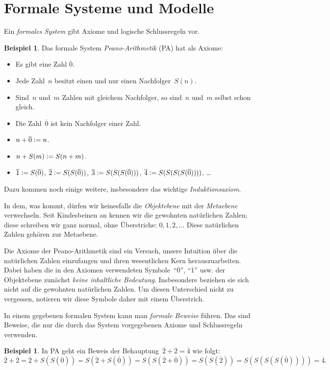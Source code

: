 \documentclass[twoside]{../zirkelblatt1415}
\theoremstyle{definition}
\newtheorem{bsp}[defn]{Beispiel}
\theoremstyle{plain}
\theoremstyle{remark}
\newcommand{\defeq}{\vcentcolon=}
\newcommand{\ol}[1]{\overline{#1}}
\begin{document}
\section{Formale Systeme und Modelle}

Ein \emph{formales System} gibt Axiome und logische Schlussregeln vor.

\begin{bsp}Das formale System \emph{Peano-Arithmetik} (PA) hat als Axiome:
\begin{itemize}
\item Es gibt eine Zahl $\ol{0}$.
\item Jede Zahl~$n$ besitzt einen und nur einen Nachfolger~$S(n)$.
\item Sind~$n$ und~$m$ Zahlen mit gleichem Nachfolger, so sind~$n$ und~$m$
selbst schon gleich.
\item Die Zahl~$\ol{0}$ ist kein Nachfolger einer Zahl.
\item $n + \ol{0} \defeq n$.
\item $n + S(m) \defeq S(n+m)$.
\item $\ol{1} \defeq S(\ol{0})$, $\ol{2} \defeq S(S(\ol{0}))$, $\ol{3} \defeq S(S(S(\ol{0})))$, $\ol{4} \defeq
S(S(S(S(\ol{0}))))$, \ldots
\end{itemize}
Dazu kommen noch einige weitere, insbesondere das wichtige
\emph{Induktionsaxiom}.
\end{bsp}

In dem, was kommt, dürfen wir keinesfalls die \emph{Objektebene} mit der
\emph{Metaebene} verwechseln. Seit Kindesbeinen an kennen wir die gewohnten
natürlichen Zahlen; diese schreiben wir ganz normal, ohne Überstriche:
$0,1,2,\ldots$ Diese natürlichen Zahlen gehören zur Metaebene.

Die Axiome der Peano-Arithmetik sind ein Versuch, unsere Intuition über die
natürlichen Zahlen einzufangen und ihren wesentlichen Kern herauszuarbeiten.
Dabei haben die in den Axiomen verwendeten Symbole~"`$\ol{0}$"', "`$\ol{1}$"'
usw. der Objektebene zunächst \emph{keine inhaltliche Bedeutung}. Insbesondere
beziehen sie sich nicht auf die gewohnten natürlichen Zahlen. Um diesen
Unterschied nicht zu vergessen, notieren wir diese Symbole daher mit einem
Überstrich.

In einem gegebenen formalen System kann man \emph{formale Beweise} führen. Das
sind Beweise, die nur die durch das System vorgegebenen Axiome und
Schlussregeln verwenden.

\begin{bsp}In PA geht ein Beweis der Behauptung~$\ol{2} + \ol{2} = \ol{4}$ wie folgt:
\[
  \ol{2} + \ol{2} = \ol{2} + S(S(\ol{0})) = S(\ol{2} + S(\ol{0})) = S(S(\ol{2} + \ol{0})) = S(S(\ol{2})) = S(S(S(S(\ol{0})))) = \ol{4}.
\]
\end{bsp}
\end{document}
